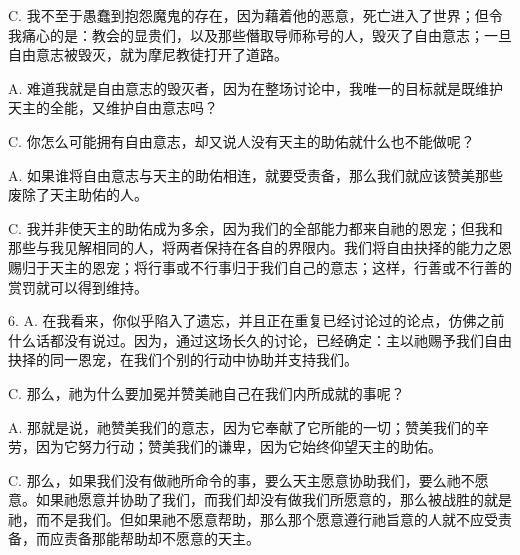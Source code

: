 C. 我不至于愚蠢到抱怨魔鬼的存在，因为藉着他的恶意，死亡进入了世界；但令我痛心的是：教会的显贵们，以及那些僭取导师称号的人，毁灭了自由意志；一旦自由意志被毁灭，就为摩尼教徒打开了道路。\par

A. 难道我就是自由意志的毁灭者，因为在整场讨论中，我唯一的目标就是既维护天主的全能，又维护自由意志吗？\par

C. 你怎么可能拥有自由意志，却又说人没有天主的助佑就什么也不能做呢？\par

A. 如果谁将自由意志与天主的助佑相连，就要受责备，那么我们就应该赞美那些废除了天主助佑的人。\par

C. 我并非使天主的助佑成为多余，因为我们的全部能力都来自祂的恩宠；但我和那些与我见解相同的人，将两者保持在各自的界限内。我们将自由抉择的能力之恩赐归于天主的恩宠；将行事或不行事归于我们自己的意志；这样，行善或不行善的赏罚就可以得到维持。\par

6. A. 在我看来，你似乎陷入了遗忘，并且正在重复已经讨论过的论点，仿佛之前什么话都没有说过。因为，通过这场长久的讨论，已经确定：主以祂赐予我们自由抉择的同一恩宠，在我们个别的行动中协助并支持我们。\par

C. 那么，祂为什么要加冕并赞美祂自己在我们内所成就的事呢？\par

A. 那就是说，祂赞美我们的意志，因为它奉献了它所能的一切；赞美我们的辛劳，因为它努力行动；赞美我们的谦卑，因为它始终仰望天主的助佑。\par

C. 那么，如果我们没有做祂所命令的事，要么天主愿意协助我们，要么祂不愿意。如果祂愿意并协助了我们，而我们却没有做我们所愿意的，那么被战胜的就是祂，而不是我们。但如果祂不愿意帮助，那么那个愿意遵行祂旨意的人就不应受责备，而应责备那能帮助却不愿意的天主。\par

